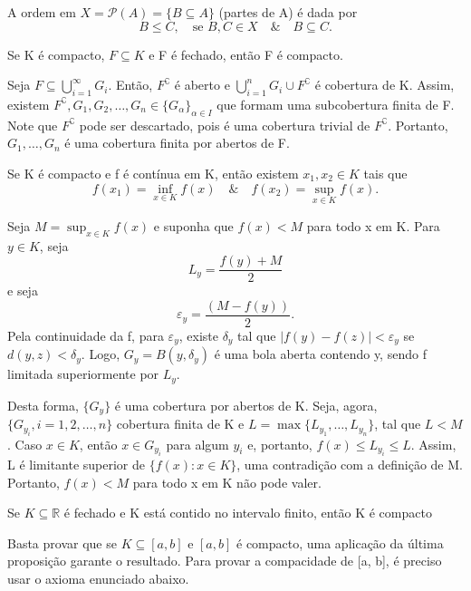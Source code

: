 \documentclass[measure_theory.tex]{subfiles}
\begin{document}
A ordem em \(X = \mathcal{P}(A) = \{B\subseteq A\}\) (partes de A) é dada por
\[
	B\leq C,\quad \text{se } B, C\in X \quad\&\quad B\subseteq C.
\]
\begin{prop*}
	Se K é compacto, \(F\subseteq K\) e F é fechado, então F é compacto.
\end{prop*}
\begin{proof*}
	Seja \(F\subseteq \bigcup_{i=1}^{\infty}G_{i}.\) Então, \(F ^{\complement}\) é aberto e \(\bigcup_{i=1}^{n}G_{i}\cup F ^{\complement}\) é cobertura de K.
	Assim, existem \(F ^{\complement}, G_{1}, G_{2}, \dotsc , G_{n}\in \{G_{\alpha }\}_{\alpha \in I}\) que formam uma subcobertura finita de F. Note que \(F ^{\complement}\) pode ser
	descartado, pois é uma cobertura trivial de \(F ^{\complement}\). Portanto, \(G_{1}, \dotsc , G_{n}\) é uma cobertura finita por abertos de F. \qedsymbol
\end{proof*}
\begin{prop*}
	Se K é compacto e f é contínua em K, então existem \(x_{1}, x_{2}\in K\) tais que
	\[
		f(x_{1}) = \inf_{x\in K}f(x)\quad\&\quad f(x_{2}) = \sup_{x\in K}f(x).
	\]
\end{prop*}
\begin{proof*}
	Seja \(M = \sup_{x\in K}f(x)\) e suponha que \(f(x) < M\) para todo x em K. Para \(y\in K\), seja
	\[
		L_{y} = \frac{f(y) + M}{2}
	\]
	e seja
	\[
		\varepsilon_y = \frac{(M-f(y))}{2}.
	\]
	Pela continuidade da f, para \(\varepsilon_y\), existe \(\delta _y\) tal que \(|f(y) - f(z)| < \varepsilon_{y}\) se \(d(y, z)< \delta_y.\)
	Logo, \(G_{y} = B(y, \delta_y)\) é uma bola aberta contendo y, sendo f limitada superiormente por \(L_y\).

	Desta forma, \(\{G_y\}\) é uma cobertura por abertos de K. Seja, agora, \(\{G_{y_{i}}, i = 1, 2, \dotsc , n\}\) cobertura finita de K e \(L = \max\{L_{y_1}, \dotsc , L_{y_{n}}\}\),
	tal que \(L < M\). Caso \(x\in K\), então \(x\in G_{y_{i}}\) para algum \(y_{i}\) e, portanto, \(f(x) \leq L_{y_{i}} \leq L.\) Assim, L é limitante superior de \(\{f(x):x \in K\}\), uma
	contradição com a definição de M. Portanto, \(f(x) < M\) para todo x em K não pode valer. \qedsymbol
\end{proof*}
\begin{prop*}
	Se \(K\subseteq \mathbb{R}\) é fechado e K está contido no intervalo finito, então K é compacto
\end{prop*}
\begin{proof*}
	Basta provar que se \(K\subseteq [a, b]\) e \([a, b]\) é compacto, uma aplicação da última proposição garante o resultado.
	Para provar a compacidade de [a, b], é preciso usar o axioma enunciado abaixo. \qedsymbol
\end{proof*}
\end{document}
